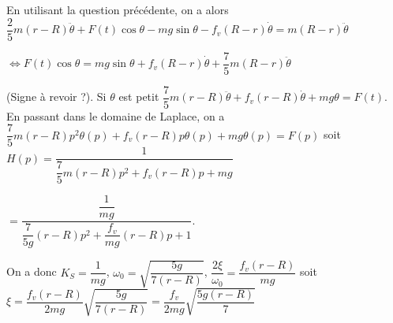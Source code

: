 \begin{corrigebox}
En utilisant la question précédente, on a alors 
$\dfrac{2}{5}m(r-R)\ddot{\theta}+F(t)\cos\theta-mg\sin\theta -f_v \left(R-r\right)\dot{\theta} =  m(R-r)\ddot{\theta}$

$\Longleftrightarrow F(t)\cos\theta = mg\sin\theta  + f_v \left(R-r\right)\dot{\theta} + \dfrac{7}{5}m(R-r)\ddot{\theta}$

(Signe à revoir ?).
Si $\theta$ est petit $\dfrac{7}{5}m\left(r-R\right)\ddot{\theta} +f_v\left(r-R\right)\dot{\theta}+mg\theta=F(t)$. 
En passant dans le domaine de Laplace, on a $\dfrac{7}{5}m\left(r-R\right)p^2{\theta(p)} +f_v\left(r-R\right)p {\theta(p)}+mg\theta(p)=F(p)$
soit $H(p)=\dfrac{1}{\dfrac{7}{5}m\left(r-R\right)p^2 +f_v\left(r-R\right)p +mg}$

$ = \dfrac{\dfrac{1}{mg}}{\dfrac{7}{5g}\left(r-R\right)p^2 +\dfrac{f_v}{mg}\left(r-R\right)p +1}$.

On a donc $K_S = \dfrac{1}{mg}$, $\omega_0 = \sqrt{\dfrac{5g}{7\left(r-R\right)}}$,
$\dfrac{2 \xi }{\omega_0} = \dfrac{f_v\left(r-R\right)}{mg}$ soit $\xi =\dfrac{f_v\left(r-R\right)}{2mg}\sqrt{\dfrac{5g}{7\left(r-R\right)}} =\dfrac{f_v}{2mg}\sqrt{\dfrac{5g\left(r-R\right)}{7}} $
\end{corrigebox}
